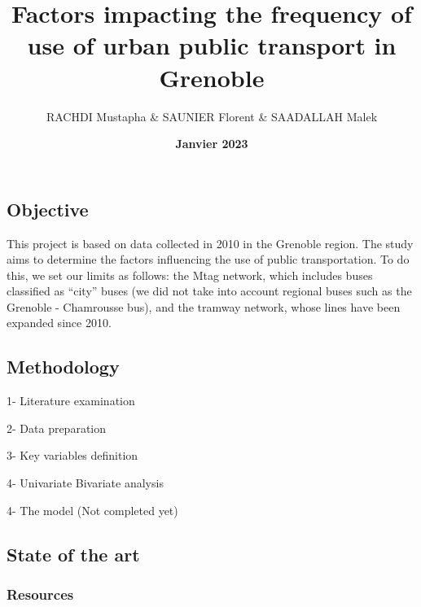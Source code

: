 \documentclass[
]{article}
\title{\textbf{Factors impacting the frequency of use of urban public
transport in Grenoble}}
\author{RACHDI Mustapha \& SAUNIER Florent \& SAADALLAH Malek}
\date{\textbf{Janvier 2023}}
\begin{document}
\maketitle

\hypertarget{objective}{%
\subsection{Objective}\label{objective}}

This project is based on data collected in 2010 in the Grenoble region.
The study aims to determine the factors influencing the use of public
transportation. To do this, we set our limits as follows: the Mtag
network, which includes buses classified as ``city'' buses (we did not
take into account regional buses such as the Grenoble - Chamrousse bus),
and the tramway network, whose lines have been expanded since 2010.

\newpage

\hypertarget{methodology}{%
\subsection{Methodology}\label{methodology}}

1- Literature examination

2- Data preparation

3- Key variables definition

4- Univariate Bivariate analysis

4- The model (Not completed yet)

\hypertarget{state-of-the-art}{%
\subsection{State of the art}\label{state-of-the-art}}

\hypertarget{resources}{%
\subsubsection{Resources}\label{resources}}
\end{document}
